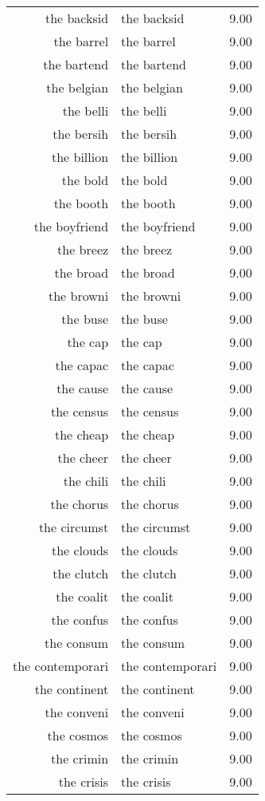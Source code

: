 \begin{table}[ht]
\begin{tabular}{rlr}
  the backsid & the backsid & 9.00 \\ 
  the barrel & the barrel & 9.00 \\ 
  the bartend & the bartend & 9.00 \\ 
  the belgian & the belgian & 9.00 \\ 
  the belli & the belli & 9.00 \\ 
  the bersih & the bersih & 9.00 \\ 
  the billion & the billion & 9.00 \\ 
  the bold & the bold & 9.00 \\ 
  the booth & the booth & 9.00 \\ 
  the boyfriend & the boyfriend & 9.00 \\ 
  the breez & the breez & 9.00 \\ 
  the broad & the broad & 9.00 \\ 
  the browni & the browni & 9.00 \\ 
  the buse & the buse & 9.00 \\ 
  the cap & the cap & 9.00 \\ 
  the capac & the capac & 9.00 \\ 
  the cause & the cause & 9.00 \\ 
  the census & the census & 9.00 \\ 
  the cheap & the cheap & 9.00 \\ 
  the cheer & the cheer & 9.00 \\ 
  the chili & the chili & 9.00 \\ 
  the chorus & the chorus & 9.00 \\ 
  the circumst & the circumst & 9.00 \\ 
  the clouds & the clouds & 9.00 \\ 
  the clutch & the clutch & 9.00 \\ 
  the coalit & the coalit & 9.00 \\ 
  the confus & the confus & 9.00 \\ 
  the consum & the consum & 9.00 \\ 
  the contemporari & the contemporari & 9.00 \\ 
  the continent & the continent & 9.00 \\ 
  the conveni & the conveni & 9.00 \\ 
  the cosmos & the cosmos & 9.00 \\ 
  the crimin & the crimin & 9.00 \\ 
  the crisis & the crisis & 9.00 \\ 

\end{tabular}
\end{table}
